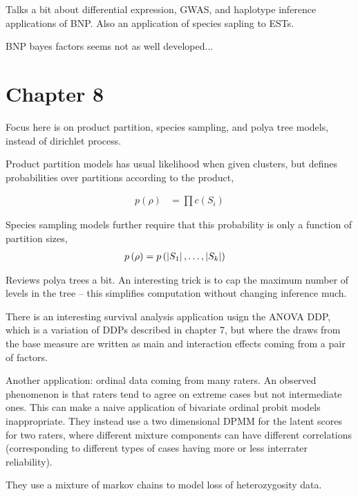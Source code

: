 \documentclass{article}
\begin{document}
Talks a bit about differential expression, GWAS, and haplotype inference
applications of BNP. Also an application of species sapling to ESTs.

BNP bayes factors seems not as well developed...

\section{Chapter 8}
\label{sec:chapter_8}

Focus here is on product partition, species sampling, and polya tree models,
instead of dirichlet process.

Product partition models has usual likelihood when given clusters, but defines
probabilities over partitions according to the product,

\begin{align}
p\left(\rho\right) &=\prod c\left(S_{i}\right)
\end{align}

Species sampling models further require that this probability is only a function
of partition sizes,
\begin{align}
p\left(\rho\right) &= p\left(\left|S_{1}\right|, \dots, \left|S_{k}\right|\right)
\end{align}

Reviews polya trees a bit. An interesting trick is to cap the maximum number of
levels in the tree -- this simplifies computation without changing inference
much.

There is an interesting survival analysis application usign the ANOVA DDP, which
is a variation of DDPs described in chapter 7, but where the draws from the base
measure are written as main and interaction effects coming from a pair of
factors.

Another application: ordinal data coming from many raters. An observed
phenomenon is that raters tend to agree on extreme cases but not intermediate
ones. This can make a naive application of bivariate ordinal probit models
inappropriate. They instead use a two dimensional DPMM for the latent scores for
two raters, where different mixture components can have different correlations
(corresponding to different types of cases having more or less interrater
reliability).

They use a mixture of markov chains to model loss of heterozygosity data.
\end{document}

